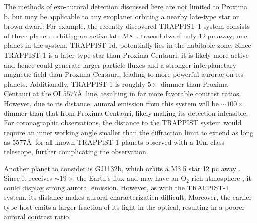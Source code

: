\documentclass{emulateapj}
\newcommand{\yyy}[1]{{\color{black} #1}} %
\begin{document}

The methods of exo-auroral detection discussed here are not limited to Proxima b, but may be applicable to any exoplanet orbiting a nearby late-type star or brown dwarf.  For example, the recently discovered TRAPPIST-1 system \citep{Gillon2016} consists of three planets orbiting an active late M8 ultracool dwarf only 12 pc away; one planet in the system, TRAPPIST-1d, potentially lies in the habitable zone. Since TRAPPIST-1 is a later type star than Proxima Centauri, it is likely more active \citep[e.g.,][]{West2008} and hence could generate larger particle fluxes and a stronger interplanetary magnetic field than Proxima Centauri, leading to more powerful aurorae on its planets. Additionally, TRAPPIST-1 is roughly $5\times$ dimmer than Proxima Centauri at the OI $5577$\AA\ line, resulting in far more favorable contrast ratios. However, due to its distance, auroral emission from this system will be ${\sim} 100\times$ dimmer than that from Proxima Centauri, likely making its detection infeasible. For coronagraphic observations, the distance to the TRAPPIST system would require an inner working angle smaller than the diffraction limit to extend as long as 5577\AA\ for all known TRAPPIST-1 planets observed with a 10m class telescope, further complicating the observation.

Another planet to consider is GJ1132b, which orbits a M3.5 star 12 pc away \citep{Berta2015}. Since it receives ${\sim} 19\times$ the Earth's flux and may have an O$_2$ rich atmosphere \citep{Schaefer2016}, it could display strong auroral emission. However, as with the TRAPPIST-1 system, its distance makes auroral characterization difficult. Moreover, the earlier type host emits a larger fraction of its light in the optical, resulting in a poorer auroral contrast ratio.
\end{document}
